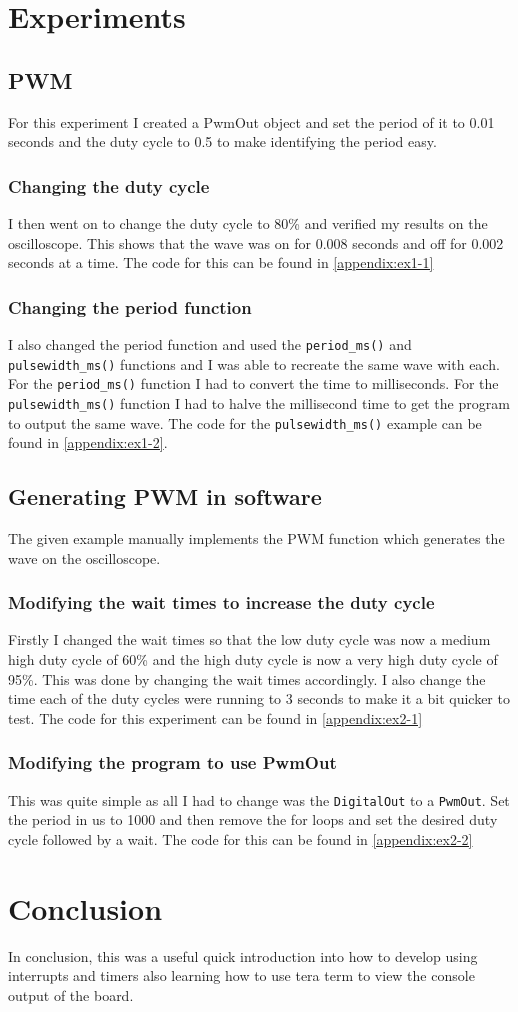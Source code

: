 \documentclass[a4paper,12pt]{scrartcl}
\begin{document}
	\section{Experiments}
	{
		\subsection{PWM}
		{
			For this experiment I created a PwmOut object and set the period of it to 0.01 seconds and the duty cycle to 0.5 to make identifying the period easy.
			\subsubsection{Changing the duty cycle}
			{
				I then went on to change the duty cycle to 80\% and verified my results on the oscilloscope. This shows that the wave was on for 0.008 seconds and off for 0.002 seconds at a time. The code for this can be found in \cref{appendix:ex1-1}
			}
			\subsubsection{Changing the period function}
			{
				I also changed the period function and used the \lstinline|period_ms()| and \lstinline|pulsewidth_ms()| functions and I was able to recreate the same wave with each. For the \lstinline|period_ms()| function I had to convert the time to milliseconds. For the \lstinline|pulsewidth_ms()| function I had to halve the millisecond time to get the program to output the same wave. The code for the \lstinline|pulsewidth_ms()| example can be found in \cref{appendix:ex1-2}.
			}
		}
		\subsection{Generating PWM in software}
		{
			The given example manually implements the PWM function which generates the wave on the oscilloscope.
			\subsubsection{Modifying the wait times to increase the duty cycle}
			{
				Firstly I changed the wait times so that the low duty cycle was now a medium high duty cycle of 60\% and the high duty cycle is now a very high duty cycle of 95\%. This was done by changing the wait times accordingly. I also change the time each of the duty cycles were running to 3 seconds to make it a bit quicker to test. The code for this experiment can be found in \cref{appendix:ex2-1}
			}
			\subsubsection{Modifying the program to use PwmOut}
			{
				This was quite simple as all I had to change was the \lstinline|DigitalOut| to a \lstinline|PwmOut|. Set the period in us to 1000 and then remove the for loops and set the desired duty cycle followed by a wait. The code for this can be found in \cref{appendix:ex2-2}
			}
		}
	}

	\section{Conclusion}
	{
		In conclusion, this was a useful quick introduction into how to develop using interrupts and timers also learning how to use tera term to view the console output of the board.
	}
	
	\newpage
	
	\printbibliography[heading=bibintoc,title=References]
\end{document}
